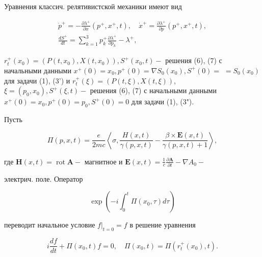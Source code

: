 \documentclass[10pt]{article}
\begin{document}
Уравнения классич. релятивистской механики имеют вид



\[

\begin{gathered}

\dot{p}^{+}=-\frac{\partial \lambda^{+}}{\partial x}\left(p^{+}, x^{+}, t\right), \quad \dot{x}^{+}=\frac{\partial \lambda^{+}}{\partial p}\left(p^{+}, x^{+}, t\right), \\

\frac{d S^{+}}{d t}=\sum_{k=1}^{3} p_{k}^{+} \frac{\partial \lambda^{+}}{\partial p_{k}}-\lambda^{+},

\end{gathered}

\]



$r_{t}^{+}\left(x_{0}\right)=\left(P\left(t, x_{0}\right), X\left(t, x_{0}\right)\right), S^{+}\left(x_{0}, t\right)-$ решения (6), (7) с начальными данными $x^{+}(0)=x_{0}, p^{+}(0)=\nabla S_{0}\left(x_{0}\right), S^{+}(0)=$ $=S_{0}\left(x_{0}\right)$ для задачи (1), (3') и $r_{t}^{+}(\xi)=(P(t, \xi), X(t, \xi))$, $\xi=\left(p_{0}, x_{0}\right), S^{+}(\xi, t)-$ решения (6), (7) с начальными данными $x^{+}(0)=x_{0}, p^{+}(0)=p_{0}, S^{+}(0)=0$ для задачи (1), (3").



Пусть



\[

\Pi(p, x, t)=\frac{e}{2 m c}\left\langle\sigma, \frac{H(x, t)}{\gamma(p, x, t)}-\frac{\beta \times \boldsymbol{E}(x, t)}{\gamma(p, x, t)+1}\right\rangle,

\]



где $\boldsymbol{H}(x, t)=\operatorname{rot} \boldsymbol{A}-$ магнитное и $\boldsymbol{E}(x, t)=\frac{1}{c} \frac{\partial \boldsymbol{A}}{\partial t}-\nabla A_{0}-$

электрич. поле. Оператор



\[

\exp \left(-i \int_{0}^{t} \Pi\left(x_{0}, \tau\right) d \tau\right)

\]



переводит начальное условие $\left.f\right|_{t=0}=f$ в решение уравнения



\[

i \frac{d f}{d t}+\Pi\left(x_{0}, t\right) f=0, \quad \Pi\left(x_{0}, t\right)=\Pi\left(r_{t}^{+}\left(x_{0}\right), t\right) .

\]
\end{document}
